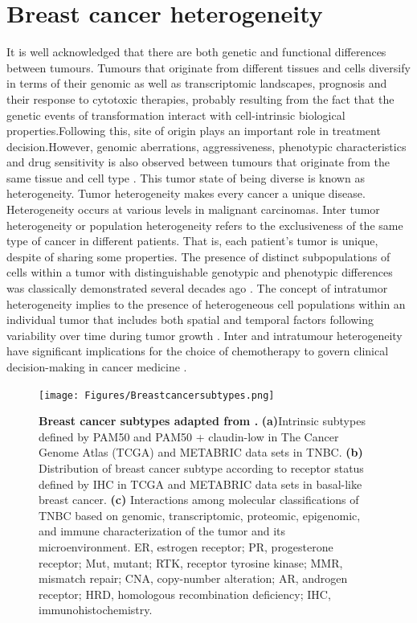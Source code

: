 
\section{Breast cancer heterogeneity}
It is well acknowledged that there are both genetic and functional differences between tumours. Tumours that originate from different tissues and cells diversify in terms of their genomic as well as transcriptomic landscapes, prognosis and their response to cytotoxic therapies, probably resulting from the fact that the genetic events of transformation interact with cell-intrinsic biological properties.Following this, site of origin plays an important role in treatment decision.However, genomic aberrations, aggressiveness, phenotypic characteristics and drug sensitivity is also observed between tumours that originate from the same tissue and cell type \cite{vogelstein2013cancer}. This tumor state of being diverse is known as heterogeneity.
Tumor heterogeneity makes every cancer a unique disease. Heterogeneity occurs at various levels in malignant carcinomas. Inter tumor heterogeneity or population heterogeneity refers to the exclusiveness of the same type of cancer in different patients. That is, each patient's tumor is unique, despite of sharing some properties. The presence of distinct subpopulations of cells within a tumor with distinguishable genotypic and phenotypic differences was classically demonstrated several decades ago \cite{fidler1978tumor}.
The concept of intratumor heterogeneity implies to the presence of heterogeneous cell populations within an individual tumor that includes both spatial and temporal factors following variability over time during tumor growth \cite{ellsworth2017molecular, welch2016tumor}. Inter and intratumour heterogeneity have significant implications for the choice of chemotherapy to govern clinical decision-making in cancer medicine \cite{bedard2013tumour}.


\begin{figure}
\centering
\texttt{[image: Figures/Breastcancersubtypes.png]}
	\caption[Breast cancer subtypes]
	{\small
	    \textbf{Breast cancer subtypes adapted from \cite{garrido2019insights}.}
	    \textbf{(a)}Intrinsic subtypes defined by PAM50 and PAM50 + claudin-low in The Cancer Genome Atlas (TCGA) and METABRIC data sets in \ac{TNBC}.
	    \textbf{(b)} Distribution of breast cancer subtype according to receptor status defined by IHC in TCGA and METABRIC data sets in basal-like breast cancer.
	    \textbf{(c)} Interactions among molecular classifications of TNBC based on genomic, transcriptomic, proteomic, epigenomic, and immune characterization of the tumor and its microenvironment. ER, estrogen receptor; PR, progesterone receptor; Mut, mutant; RTK, receptor tyrosine kinase; MMR, mismatch repair; CNA, copy-number alteration; AR, androgen receptor; HRD, homologous recombination deficiency; IHC, immunohistochemistry.
	}
	\label{fig:Breastcancersubtypes}
\end{figure}




